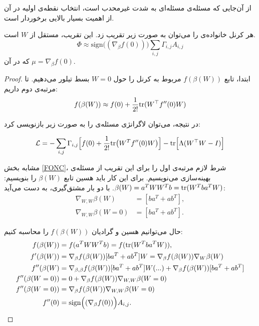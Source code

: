 از آن‌جایی که مسئله‌ی 
مسئله‌ای به شدت غیرمحدب است، انتخاب نقطه‌ی اولیه در آن از اهمیت بسیار بالایی برخوردار است.
\begin{thm}
\label{phi0}
هر کرنل خانواده‌ی 
را می‌توان به صورت زیر تقریب زد. این تقریب، مستقل از 
$W$
است.
\begin{equation}
\Phi \approx \mathrm{sign}\Big( (\nabla_\beta f(0))\Big) \sum_{i, j} \Gamma_{i, j} A_{i, j}
\end{equation}
که در آن
$\mu = \nabla_\beta f(0)$.

\begin{proof}
ابتدا، تابع 
$f(\beta(W))$
مربوط به کرنل 
را حول 
$W = 0$
بسط تیلور می‌دهیم. تا مرتبه‌ی دوم داریم:
\begin{equation}
f(\beta(W)) \approx f(0) + \frac{1}{2!} \mathrm{tr} (W^\top f''(0)W)
\end{equation}

در نتیجه، می‌توان لاگرانژی مسئله‌ی 
را به صورت زیر بازنویسی کرد:

\begin{equation}
\mathcal{L} = -\sum_{i, j} \Gamma_{i, j} \Big[f(0) + \frac{1}{2!} \mathrm{tr} \big(W^T f''(0)W\big)\Big] - \mathrm{tr}\Big[\Lambda(W^\top W - I)\Big]
\end{equation}

مشابه بخش
\eqref{FONC}،
شرط لازم مرتبه‌ی اول را برای این تقریب از مسئله‌‌ی بهینه‌سازی می‌نویسیم.  برای این کار باید هسین تابع
$\beta(W)$
را بنویسیم:
$\beta(W) = a^TWW^Tb = \mathrm{tr}(W^Tba^TW)$.
با دو بار مشتق‌گیری، به دست می‌آید:
\begin{align}
\nabla_{W,W} \beta(W) &= [ba^T+ab^T],\\
\nabla_{W,W} \beta(W=0) &= [ba^T+ab^T].
\end{align}

حال می‌توانیم هسین و گرادیان 
$f(\beta(W))$
را محاسبه کنیم:
\small
 \begin{align}
f(\beta(W)) &= f(a^TWW^Tb) = f(\mathrm{tr}(W^Tba^TW)),\\
f'(\beta(W)) &= \nabla_{\beta} f(\beta(W))[ba^T+ab^T]W = 
\nabla_{\beta} f(\beta(W)) \nabla_W \beta(W)\\
f''(\beta(W) &= \nabla_{\beta,\beta} f(\beta(W))[ba^T+ab^T]W(...) + \nabla_{\beta} f(\beta(W))[ba^T+ab^T]\\
f''(\beta(W=0)) &= 0 + \nabla_{\beta} f(\beta(W))\nabla_{W,W} \beta(W=0)\\
f''(\beta(W=0)) &= \nabla_{\beta} f(\beta(W))\nabla_{W,W} \beta(W=0)\\
f''(0) &= \mathrm{sign}\Big( (\nabla_\beta f(0))\Big) A_{i,j}.
\end{align}
\normalsize


\end{proof}
\end{thm}
